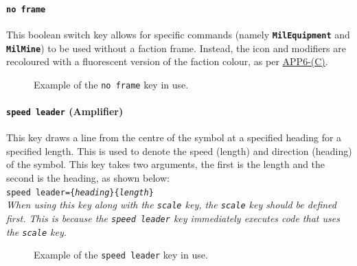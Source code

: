 \documentclass[a4paper, titlepage]{article}
\newcommand\DocLink{\href{https://web.archive.org/web/20150921231042/http://armawiki.zumorc.de/files/NATO/APP-6(C).pdf}{APP6-(C)}}
\begin{document}
\paragraph{\texttt{no frame}}

This boolean switch key allows for specific commands (namely \textbf{\texttt{MilEquipment}} and \textbf{\texttt{MilMine}}) to be used without a faction frame. Instead, the icon and modifiers are recoloured with a fluorescent version of the faction colour, as per \DocLink.

\begin{figure}[H]
\centering
{}
\caption{Example of the \texttt{no frame} key in use.}
\end{figure}

\paragraph{\texttt{speed leader} (Amplifier)}

This key draws a line from the centre of the symbol at a specified heading for a specified length. This is used to denote the speed (length) and direction (heading) of the symbol. This key takes two arguments, the first is the length and the second is the heading, as shown below:\\

\texttt{speed leader=\{\textit{heading}\}\{\textit{length}\}}\\

\textit{When using this key along with the \texttt{scale} key, the \texttt{scale} key should be defined first. This is because the \texttt{speed leader} key immediately executes code that uses the \texttt{scale} key.}

\begin{figure}[H]
\centering
{}
\caption{Example of the \texttt{speed leader} key in use.}
\end{figure}
\end{document}
